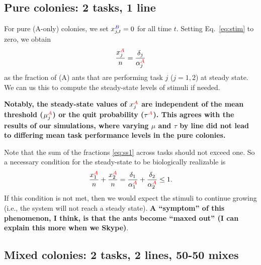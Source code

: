 \documentclass[10pt]{article}
\newcommand{\A}{{\color{red}A}}
\newcommand{\B}{{\color{blue}B}}
\begin{document}
\subsection{Pure colonies: 2 tasks, 1 line}
For pure (\A-only) colonies, we set $x_{j,t}^{\B} = 0$ for all time $t$. Setting Eq.~\eqref{eq:stim} to zero, we obtain
\begin{equation}
    \frac{x_j^{\A}}{n} = \frac{\delta_j}{\alpha_j^{\A}}
    \label{eq:ss1}
\end{equation}
as the fraction of (\A) ants that are performing task $j$ ($j = 1,2$) at steady state. We can us this to compute the steady-state levels of stimuli if needed.

\textbf{Notably, the steady-state values of $x_j^{\A}$ are \textbf{independent} of the mean threshold ($\mu_j^{\A}$) or the quit probability ($\tau^{\A}$). This agrees with the results of our simulations, where varying $\mu$ and $\tau$ by line did not lead to differing mean task performance levels in the pure colonies.}

Note that the sum of the fractions \eqref{eq:ss1} across tasks should not exceed one. So a necessary condition for the steady-state to be biologically realizable is 
\begin{equation}
    \frac{x_1^{\A}}{n} + \frac{x_2^{\A}}{n} = \frac{\delta_1}{\alpha_1^{\A}} + \frac{\delta_2}{\alpha_2^{\A} }\leq 1 \label{eq:cond1}.
\end{equation}
If this condition is not met, then we would expect the stimuli to continue growing (i.e., the system will not reach a steady state). \textbf{A ``symptom'' of this phenomenon, I think, is that the ants become ``maxed out'' (I can explain this more when we Skype)}.

\subsection{Mixed colonies: 2 tasks, 2 lines, 50-50 mixes}
\end{document}
